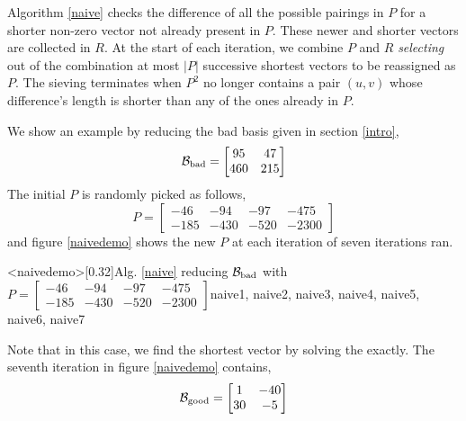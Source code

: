 \documentclass{homework}
\begin{document}
Algorithm \ref{naive} checks the difference of all the possible
pairings in $P$ for a shorter non-zero vector not already present in
$P$. These newer and shorter vectors are collected in $R$. At the
start of each iteration, we combine $P$ and $R$ \textit{selecting} out
of the combination at most $|P|$ successive shortest vectors to be
reassigned as $P$. The sieving terminates when $P^2$ no longer
contains a pair $(u, v)$ whose difference's length is shorter than any
of the ones already in $P$.

We show an example by reducing the bad basis given in section \ref{intro},
\[
  \mathcal{B}_\text{bad} =
  \begin{bmatrix}
    95  & 47  \\
    460 & 215
  \end{bmatrix}
\]
The initial $P$ is randomly picked as follows,
\[
  P =
  \begin{bmatrix}
    -46  & -94  & -97  & -475 \\
    -185 & -430 & -520 & -2300
  \end{bmatrix}
\]
and figure \ref{naivedemo} shows the new $P$ at each iteration of
seven iterations ran.

\img<naivedemo>[0.32]{Alg. \ref{naive} reducing
$\mathcal{B}_\text{bad}$ with
$P =
  \begin{bmatrix}
    -46  & -94  & -97  & -475 \\
    -185 & -430 & -520 & -2300
  \end{bmatrix}
$}{naive1, naive2, naive3, naive4, naive5, naive6, naive7}

Note that in this case, we find the shortest vector by solving the
\SBP{} exactly. The seventh iteration in figure \ref{naivedemo}
contains,
\[
  \mathcal{B}_\text{good} =
  \begin{bmatrix}
    1  & -40 \\
    30 & -5
  \end{bmatrix}
\]




\newpage


\end{document}
